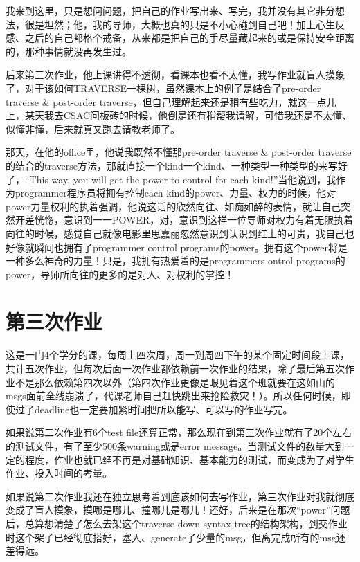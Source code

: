 \documentclass[12pt]{book}
\begin{document}
我来到这里，只是想问问题，把自己的作业写出来、写完，我并没有其它非分想法，很是坦然；他，我的导师，大概也真的只是不小心碰到自己吧！加上心生反感、之后的自己都格个戒备，从来都是把自己的手尽量藏起来的或是保持安全距离的，那种事情就没再发生过。

后来第三次作业，他上课讲得不透彻，看课本也看不太懂，我写作业就盲人摸象了，对于该如何TRAVERSE一棵树，虽然课本上的例子是结合了pre-order traverse \& post-order traverse，但自己理解起来还是稍有些吃力，就这一点儿上，某天我去CSAC问板砖的时候，他倒是还有稍帮我请解，可惜我还是不太懂、似懂非懂，后来就真又跑去请教老师了。

那天，在他的office里，他说我既然不懂那pre-order traverse \& post-order traverse的结合的traverse方法，那就直接一个kind一个kind、一种类型一种类型的来写好了，“This way, you will get the power to control for each kind!”当他说到，我作为programmer程序员将拥有控制each kind的power、力量、权力的时候，他对power力量权利的执着强调，他说这话的欣然向往、如痴如醉的表情，就让自己突然开差恍惚，意识到一一POWER，对，意识到这样一位导师对权力有着无限执着向往的时候，感觉自己就像电影里思嘉丽忽然意识到认识到红土的可贵，我自己也好像就瞬间也拥有了programmer control programs的power。拥有这个power将是一种多么神奇的力量！只是，我拥有热爱着的是programmers ontrol programs的power，导师所向往的更多的是对人、对权利的掌控！

\chapter{第三次作业}
\label{sec-27}

这是一门4个学分的课，每周上四次周，周一到周四下午的某个固定时间段上课，共计五次作业，但每次后面一次作业都依赖前一次作业的结果，除了最后第五次作业不是那么依赖第四次以外（第四次作业更像是眼见着这个班就要在这如山的msgs面前全线崩溃了，代课老师自己赶快跳出来抢险救灾！）。所以任何时候，即使过了deadline也一定要加紧时间把所以能写、可以写的作业写完。

如果说第二次作业有6个test file还算正常，那么现在到第三次作业就有了20个左右的测试文件，有了至少500条warning或是error message。当测试文件的数量大到一定的程度，作业也就已经不再是对基础知识、基本能力的测试，而变成为了对学生作业、投入时间的考量。

如果说第二次作业我还在独立思考着到底该如何去写作业，第三次作业对我就彻底变成了盲人摸象，摸哪是哪儿、撞哪儿是哪儿！还好，后来是在那次“power”问题后，总算想清楚了怎么去架这个traverse down syntax tree的结构架构，到交作业时这个架子已经彻底搭好，塞入、generate了少量的msg，但离完成所有的msg还差得远。
\end{document}
